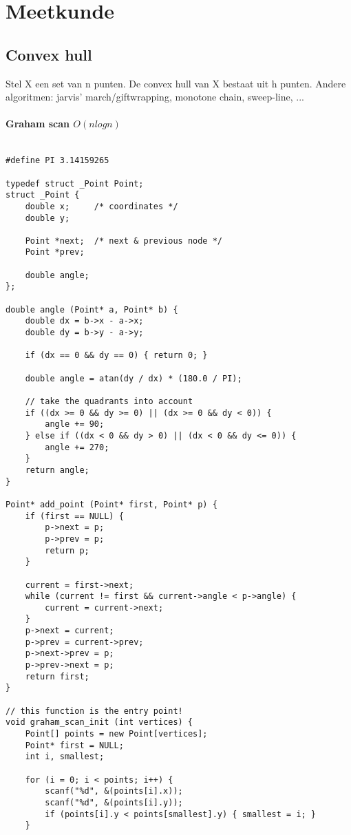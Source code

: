 \documentclass[a4paper,10pt,oneside]{report}
\begin{document}
\section{Meetkunde}
\subsection{Convex hull}
Stel X een set van n punten. De convex hull van X bestaat uit h punten.
Andere algoritmen: jarvis' march/giftwrapping, monotone chain, sweep-line, ...
\paragraph {Graham scan $O(n log n)$}
\begin{verbatim}

#define PI 3.14159265

typedef struct _Point Point;
struct _Point {
    double x;     /* coordinates */
    double y;

    Point *next;  /* next & previous node */
    Point *prev;

    double angle;
};

double angle (Point* a, Point* b) {
    double dx = b->x - a->x;
    double dy = b->y - a->y;
	
    if (dx == 0 && dy == 0) { return 0; }

    double angle = atan(dy / dx) * (180.0 / PI);

    // take the quadrants into account
    if ((dx >= 0 && dy >= 0) || (dx >= 0 && dy < 0)) {
        angle += 90;
    } else if ((dx < 0 && dy > 0) || (dx < 0 && dy <= 0)) {
        angle += 270;
    }
    return angle;
}

Point* add_point (Point* first, Point* p) {
    if (first == NULL) {
        p->next = p;
        p->prev = p;
        return p;
    }

    current = first->next;
    while (current != first && current->angle < p->angle) {
        current = current->next;
    }
    p->next = current;
    p->prev = current->prev;
    p->next->prev = p;
    p->prev->next = p;
    return first;
}

// this function is the entry point!
void graham_scan_init (int vertices) {
    Point[] points = new Point[vertices];
    Point* first = NULL;
    int i, smallest;

    for (i = 0; i < points; i++) {
        scanf("%d", &(points[i].x));
        scanf("%d", &(points[i].y));
        if (points[i].y < points[smallest].y) { smallest = i; }
    }


\end{verbatim}
\end{document}
